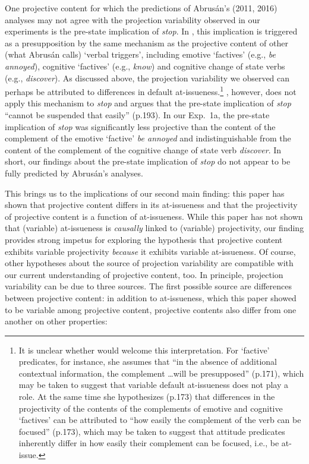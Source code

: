 \documentclass[11pt,fleqn]{article}
\newcommand{\6}{\mbox{$[\hspace*{-.6mm}[$}}
\newcommand{\9}{\mbox{$]\hspace*{-.6mm}]$}}
\begin{document}
One projective content for which the predictions of Abrus\'an's (2011, 2016) analyses may not agree with the projection variability observed in our experiments is the pre-state implication of {\em stop}. In \citealt{abrusan2011}, this implication is triggered as a presupposition by the same mechanism as the projective content of other (what Abrus\'an calls) `verbal triggers', including emotive `factives' (e.g., {\em be annoyed}), cognitive `factives' (e.g., {\em know}) and cognitive change of state verbs (e.g., {\em discover}). As discussed above, the projection variability we observed can perhaps be attributed to differences in default at-issueness.\footnote{It is unclear whether \citet{abrusan2016} would welcome this interpretation. For `factive' predicates, for instance, she assumes that ``in the absence of additional contextual information, the complement \ldots will be presupposed'' (p.171), which may be taken to suggest that variable default at-issueness does not play a role. At the same time she hypothesizes (p.173) that differences in the projectivity of the contents of the complements of emotive and cognitive `factives' can be attributed to ``how easily the complement of the verb can be focused'' (p.173), which may be taken to suggest that attitude predicates inherently differ in how easily their complement can be focused, i.e., be at-issue.}  \citet{abrusan2016}, however, does not apply this mechanism to {\em stop} and   argues that the pre-state implication of {\em stop} ``cannot be suspended that easily'' (p.193). In our Exp.~1a, the pre-state implication of {\em stop} was significantly less projective than the content of the complement of the emotive `factive' {\em be annoyed} and indistinguishable from the content of the complement of the cognitive change of state verb {\em discover}. In short, our findings about the pre-state implication of {\em stop} do not appear to be fully predicted by Abrus\'an's analyses. 

This brings us to the implications of our second main finding: this paper has shown that projective content differs in its at-issueness and that the projectivity of projective content is a function of at-issueness. While this paper has not shown that (variable) at-issueness is {\em causally} linked to (variable) projectivity, our finding provides strong impetus for exploring the hypothesis that projective content exhibits variable projectivity {\em because} it exhibits variable at-issueness. Of course, other hypotheses about the source of projection variability are compatible with our current understanding of projective content, too. In principle, projection variability can be due to three sources. The first possible source are differences between projective content: in addition to at-issueness, which this paper showed to be variable among projective content, projective contents also differ from one another on other properties:
\end{document}
